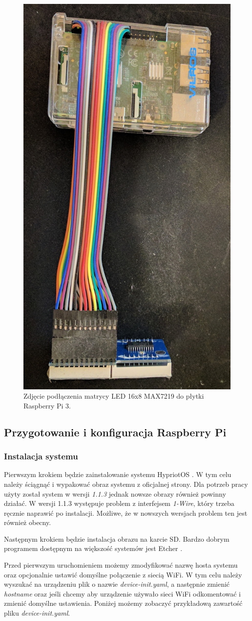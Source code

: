 \documentclass[12pt]{report}
\let\Oldsubsection\subsection
\renewcommand{\subsection}{\FloatBarrier\Oldsubsection}
\let\Oldsubsubsection\subsubsection
\renewcommand{\subsubsection}{\FloatBarrier\Oldsubsubsection}
\begin{document}
{\begin{figure}[h]
	\centering
	\includegraphics[height=1\textwidth]{images/rpi-node.jpg}
	\caption{Zdjęcie podłączenia matrycy LED 16x8 MAX7219 do płytki Raspberry Pi 3.}
\end{figure}
\FloatBarrier	
\subsection{Przygotowanie i konfiguracja Raspberry Pi}
\subsubsection{Instalacja systemu}
Pierwszym krokiem będzie zainstalowanie systemu HypriotOS \cite{hypriot}. W tym celu należy ściągnąć i wypakować obraz systemu z oficjalnej strony. Dla potrzeb pracy użyty został system w wersji \textit{1.1.3} jednak nowsze obrazy również powinny działać. W wersji 1.1.3 występuje problem z interfejsem \textit{1-Wire}, który trzeba ręcznie naprawić po instalacji. Możliwe, że w nowszych wersjach problem ten jest również obecny.

Następnym krokiem będzie instalacja obrazu na karcie SD. Bardzo dobrym programem dostępnym na większość systemów jest Etcher \cite{etcher}.

Przed pierwszym uruchomieniem możemy zmodyfikować nazwę hosta systemu oraz opcjonalnie ustawić domyślne połączenie z siecią WiFi. W tym celu należy wyszukać na urządzeniu plik o nazwie \textit{device-init.yaml}, a następnie zmienić \textit{hostname} oraz jeśli chcemy aby urządzenie używało sieci WiFi odkomentować i zmienić domyślne ustawienia. Poniżej możemy zobaczyć przykładową zawartość pliku \textit{device-init.yaml}.

}
\end{document}
